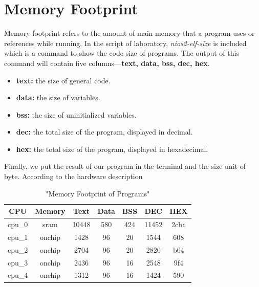 \documentclass[conference]{IEEEtran}
\begin{document}
\section{Memory Footprint}
Memory footprint refers to the amount of main memory that a program uses or references while running. In the script of laboratory, \emph{nios2-elf-size} is included which is a command to show the code size of programs. The output of this command will contain five columns---\textbf{text, data, bss, dec, hex}.
\begin{itemize}
	\item{\textbf{text:}} the size of general code.
	\item{\textbf{data:}} the size of variables.
	\item{\textbf{bss:}} the size of uninitialized variables\cite{one1996smashing}.
	\item{\textbf{dec:}} the total size of the program, displayed in decimal.
	\item{\textbf{hex:}} the total size of the program, displayed in hexadecimal.
\end{itemize}
Finally, we put the result of our program in the terminal and the size unit of byte. According to the hardware description 
\begin{table}[h]
	\centering
	\caption{"Memory Footprint of Programs"}
	\label{tab:MemoryFootprint}
	\begin{tabular}{ccccccc}
		\toprule
		CPU& Memory& Text& Data &BSS& DEC& HEX\\
		\midrule
		cpu\_0& sram & 10448& 580& 424& 11452 & 2cbc\\
		cpu\_1& onchip& 1428& 96& 20& 1544& 608\\
		cpu\_2& onchip& 2704& 96& 20& 2820& b04\\
		cpu\_3& onchip& 2436& 96& 16& 2548& 9f4\\
		cpu\_4& onchip& 1312& 96& 16& 1424& 590\\
		\bottomrule
	\end{tabular}
\end{table}
\end{document}
